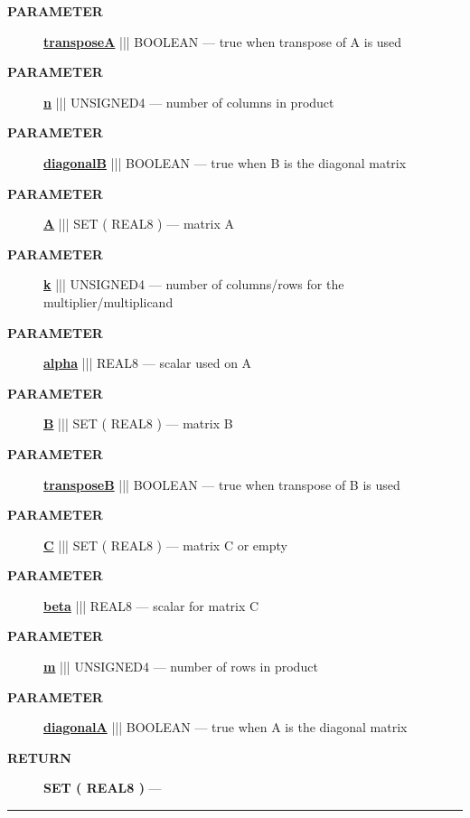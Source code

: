 \par
\begin{description}
\item [\colorbox{tagtype}{\color{white} \textbf{\textsf{PARAMETER}}}] \textbf{\underline{transposeA}} ||| BOOLEAN --- true when transpose of A is used
\item [\colorbox{tagtype}{\color{white} \textbf{\textsf{PARAMETER}}}] \textbf{\underline{n}} ||| UNSIGNED4 --- number of columns in product
\item [\colorbox{tagtype}{\color{white} \textbf{\textsf{PARAMETER}}}] \textbf{\underline{diagonalB}} ||| BOOLEAN --- true when B is the diagonal matrix
\item [\colorbox{tagtype}{\color{white} \textbf{\textsf{PARAMETER}}}] \textbf{\underline{A}} ||| SET ( REAL8 ) --- matrix A
\item [\colorbox{tagtype}{\color{white} \textbf{\textsf{PARAMETER}}}] \textbf{\underline{k}} ||| UNSIGNED4 --- number of columns/rows for the multiplier/multiplicand
\item [\colorbox{tagtype}{\color{white} \textbf{\textsf{PARAMETER}}}] \textbf{\underline{alpha}} ||| REAL8 --- scalar used on A
\item [\colorbox{tagtype}{\color{white} \textbf{\textsf{PARAMETER}}}] \textbf{\underline{B}} ||| SET ( REAL8 ) --- matrix B
\item [\colorbox{tagtype}{\color{white} \textbf{\textsf{PARAMETER}}}] \textbf{\underline{transposeB}} ||| BOOLEAN --- true when transpose of B is used
\item [\colorbox{tagtype}{\color{white} \textbf{\textsf{PARAMETER}}}] \textbf{\underline{C}} ||| SET ( REAL8 ) --- matrix C or empty
\item [\colorbox{tagtype}{\color{white} \textbf{\textsf{PARAMETER}}}] \textbf{\underline{beta}} ||| REAL8 --- scalar for matrix C
\item [\colorbox{tagtype}{\color{white} \textbf{\textsf{PARAMETER}}}] \textbf{\underline{m}} ||| UNSIGNED4 --- number of rows in product
\item [\colorbox{tagtype}{\color{white} \textbf{\textsf{PARAMETER}}}] \textbf{\underline{diagonalA}} ||| BOOLEAN --- true when A is the diagonal matrix
\end{description}







\par
\begin{description}
\item [\colorbox{tagtype}{\color{white} \textbf{\textsf{RETURN}}}] \textbf{SET ( REAL8 )} --- 
\end{description}




\rule{\linewidth}{0.5pt}
